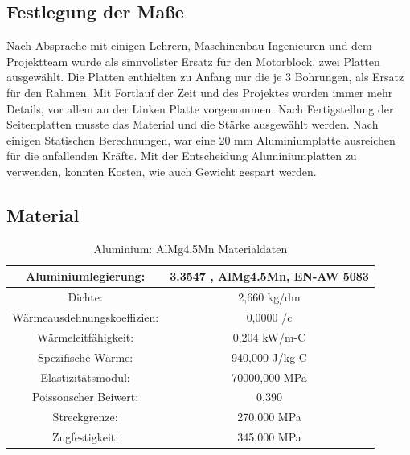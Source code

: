 \subsection{Festlegung der Maße}

Nach Absprache mit einigen Lehrern, Maschinenbau-Ingenieuren und dem Projektteam wurde als sinnvollster Ersatz für den Motorblock, zwei Platten ausgewählt. Die Platten enthielten zu Anfang nur die je 3 Bohrungen, als Ersatz für den Rahmen. Mit Fortlauf der Zeit und des Projektes wurden immer mehr Details, vor allem an der Linken Platte vorgenommen. Nach Fertigstellung der Seitenplatten musste das Material und die Stärke ausgewählt werden. Nach einigen Statischen Berechnungen, war eine 20 mm Aluminiumplatte ausreichen für die anfallenden Kräfte. Mit der Entscheidung Aluminiumplatten zu verwenden, konnten Kosten, wie auch Gewicht gespart werden.

\subsection{Material}
\begin{table} [H]
	\begin{center}
		\begin{tabular}{|c|c|}
		\hline
		Aluminiumlegierung:			& 3.3547 ,  AlMg4.5Mn, EN-AW 5083 \\ \hline
		Dichte:						& 2,660 kg/dm		\\ \hline
		Wärmeausdehnungskoeffizien:	& 0,0000 /c			\\ \hline
		Wärmeleitfähigkeit:			& 0,204 kW/m-C		\\ \hline
		Spezifische Wärme:			& 940,000 J/kg-C	\\ \hline
		Elastizitätsmodul:			& 70000,000 MPa		\\ \hline
		Poissonscher Beiwert:		& 0,390				\\ \hline
		Streckgrenze:				& 270,000 MPa		\\ \hline
		Zugfestigkeit:				& 345,000 MPa		\\ \hline
		\end{tabular}
		\caption{Aluminium: AlMg4.5Mn Materialdaten}
	\end{center}
\end{table}


